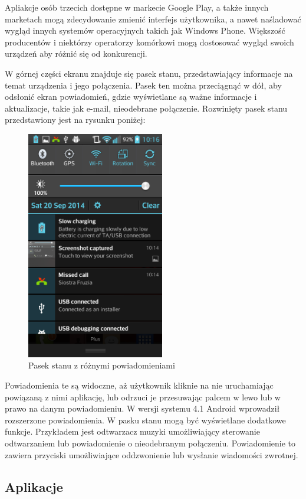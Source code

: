 Apliakcje osób trzecich dostępne w markecie Google Play, a także innych marketach mogą zdecydowanie zmienić interfejs użytkownika, a nawet naśladować wygląd innych systemów operacyjnych takich jak Windows Phone.\cite{android:29} Większość producentów i niektórzy operatorzy komórkowi mogą dostosować wygląd swoich urządzeń aby różnić się od konkurencji. \cite{android:30}

W górnej części ekranu znajduje się pasek stanu, przedstawiający informacje na temat urządzenia i jego połączenia. Pasek ten można przeciągnąć w dół, aby odsłonić ekran powiadomień, gdzie wyświetlane są ważne informacje i aktualizacje, takie jak e-mail, nieodebrane połączenie. Rozwinięty pasek stanu przedstawiony jest na rysunku poniżej:

\begin{figure}[H] 
\centering\includegraphics[width=6cm]{figures/android/statusbar}
\caption{Pasek stanu z różnymi powiadomieniami}
\end{figure}

Powiadomienia te są widoczne, aż użytkownik kliknie na nie uruchamiając powiązaną z nimi aplikację, lub odrzuci je przesuwając palcem w lewo lub w prawo na danym powiadomieniu. W wersji systemu 4.1 Android wprowadził rozszerzone powiadomienia. W pasku stanu mogą być wyświetlane dodatkowe funkcje. Przykładem jest odtwarzacz muzyki umożliwiający sterowanie odtwarzaniem lub powiadomienie o nieodebranym połączeniu. Powiadomienie to zawiera przyciski umożliwiające oddzwonienie lub wysłanie wiadomości zwrotnej.\cite{android:31}

\subsection{Aplikacje}

